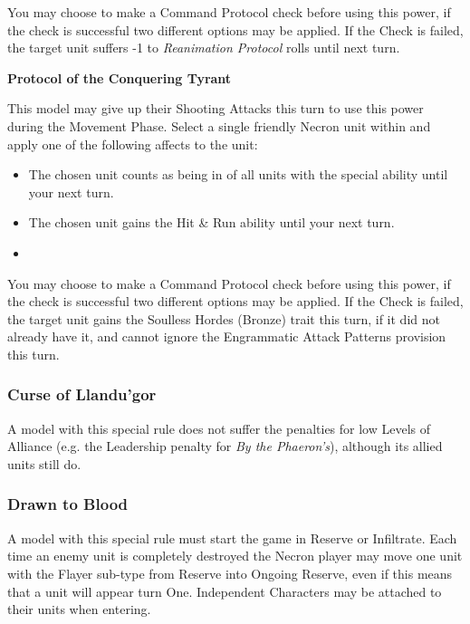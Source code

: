 \begin{multicols}{2}
You may choose to make a Command Protocol check before using this power, if the check is successful two different options may be applied. If the Check is failed, the target unit suffers -1 to \textit{Reanimation Protocol} rolls until next turn.

\textbf{Protocol of the Conquering Tyrant}

This model may give up their Shooting Attacks this turn to use this power during the Movement Phase. Select a single friendly Necron unit within  and apply one of the following affects to the unit:

\begin{itemize}
	\itemsep 0pt
	\item The chosen unit counts as being in  of all units with the  special ability until your next turn.
	\item The chosen unit gains the Hit \& Run ability until your next turn.
	\item 
\end{itemize}

You may choose to make a Command Protocol check before using this power, if the check is successful two different options may be applied. If the Check is failed, the target unit gains the Soulless Hordes (Bronze) trait this turn, if it did not already have it, and cannot ignore the Engrammatic Attack Patterns provision this turn.

\subsubsection{Curse of Llandu'gor} \label{Curse of Llandu'gor}

A model with this special rule does not suffer the penalties for low Levels of Alliance (e.g. the Leadership penalty for \textit{By the Phaeron's}), although its allied units still do.

\subsubsection{Drawn to Blood} \label{Drawn to Blood}

A model with this special rule must start the game in Reserve or Infiltrate. Each time an enemy unit is completely destroyed the Necron player may move one unit with the Flayer sub-type from Reserve into Ongoing Reserve, even if this means that a unit will appear turn One. Independent Characters may be attached to their units when entering.


\end{multicols}
